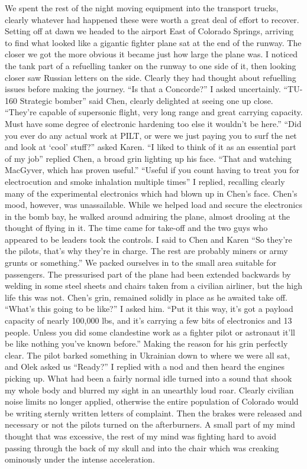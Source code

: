 \documentclass[a4paper]{article}
\begin{document}
We spent the rest of the night moving equipment into the transport trucks, clearly whatever had happened these were worth a great deal of effort to recover. Setting off at dawn we headed to the airport East of Colorado Springs, arriving to find what looked like a gigantic fighter plane sat at the end of the runway. The closer we got the more obvious it became just how large the plane was. I noticed the tank part of a refuelling tanker on the runway to one side of it, then looking closer saw Russian letters on the side. Clearly they had thought about refuelling issues before making the journey.
“Is that a Concorde?” I asked uncertainly.
“TU-160 Strategic bomber” said Chen, clearly delighted at seeing one up close. “They’re capable of supersonic flight, very long range and great carrying capacity. Must have some degree of electronic hardening too else it wouldn’t be here.”
“Did you ever do any actual work at PILT, or were we just paying you to surf the net and look at ‘cool’ stuff?” asked Karen.
“I liked to think of it as an essential part of my job” replied Chen, a broad grin lighting up his face. “That and watching MacGyver, which has proven useful.”
“Useful if you count having to treat you for electrocution and smoke inhalation multiple times” I replied, recalling clearly many of the experimental electronics which had blown up in Chen’s face.
Chen’s mood, however, was unassailable. While we helped load and secure the electronics in the bomb bay, he walked around admiring the plane, almost drooling at the thought of flying in it.
The time came for take-off and the two guys who appeared to be leaders took the controls.
I said to Chen and Karen “So they’re the pilots, that’s why they’re in charge. The rest are probably miners or army grunts or something.”
We packed ourselves in to the small area suitable for passengers. The pressurised part of the plane had been extended backwards by welding in some steel sheets and chairs taken from a civilian airliner, but the high life this was not. Chen’s grin, remained solidly in place as he awaited take off.
“What’s this going to be like?” I asked him.
“Put it this way, it’s got a payload capacity of nearly 100,000 lbs, and it’s carrying a few bits of electronics and 13 people. Unless you did some clandestine work as a fighter pilot or astronaut it’ll be like nothing you’ve known before.” Making the reason for his grin perfectly clear.
The pilot barked something in Ukrainian down to where we were all sat, and Olek asked us “Ready?” I replied with a nod and then heard the engines picking up. What had been a fairly normal idle turned into a sound that shook my whole body and blurred my sight in an unearthly loud roar. Clearly civilian noise limits no longer applied, otherwise the entire population of Colorado would be writing sternly written letters of complaint. Then the brakes were released and necessary or not the pilots turned on the afterburners. A small part of my mind thought that was excessive, the rest of my mind was fighting hard to avoid passing through the back of my skull and into the chair which was creaking ominously under the intense acceleration.
\end{document}

